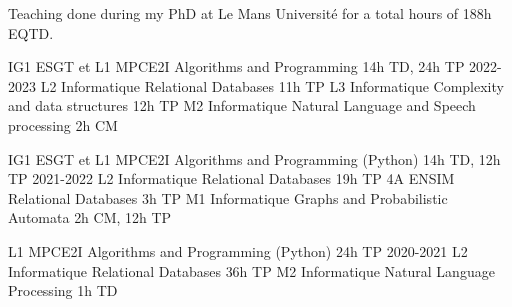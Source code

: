 
Teaching done during my PhD at Le Mans Université for a total hours of 188h EQTD.

\begin{cvhonors}
\cvhonor
    {IG1 ESGT et L1 MPCE2I}
    {Algorithms and Programming}
    {14h TD, 24h TP}
    {2022-2023}
\cvhonor
    {L2 Informatique}
    {Relational Databases}
    {11h TP}
    {}
\cvhonor
    {L3 Informatique}
    {Complexity and data structures}
    {12h TP}
    {}
\cvhonor
    {M2 Informatique}
    {Natural Language and Speech processing}
    {2h CM}
    {}

\cvhonor
    {IG1 ESGT et L1 MPCE2I}
    {Algorithms and Programming (Python)}
    {14h TD, 12h TP}
    {2021-2022}
\cvhonor
    {L2 Informatique}
    {Relational Databases}
    {19h TP}
    {}
\cvhonor
    {4A ENSIM}
    {Relational Databases}
    {3h TP}
    {}
\cvhonor
    {M1 Informatique}
    {Graphs and Probabilistic Automata}
    {2h CM, 12h TP}
    {}

\cvhonor
    {L1 MPCE2I}
    {Algorithms and Programming (Python)}
    {24h TP}
    {2020-2021}
\cvhonor
    {L2 Informatique}
    {Relational Databases}
    {36h TP}
    {}
\cvhonor
    {M2 Informatique}
    {Natural Language Processing}
    {1h TD}
    {}
\end{cvhonors}

